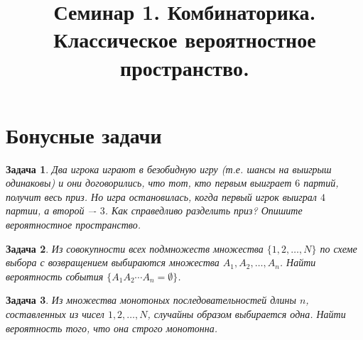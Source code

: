 \documentclass[11pt]{article}
\title{Семинар 1. Комбинаторика. Классическое вероятностное пространство.}
\date{\vspace{-1cm}}
\newtheorem{fproblem}{Задача}
\begin{document}
\maketitle

\section*{Бонусные задачи}
\begin{fproblem}
    Два игрока играют в безобидную игру (т.е. шансы на выигрыш одинаковы) и они договорились, что тот, кто первым выиграет $6$ партий, получит весь приз.
    Но игра остановилась, когда первый игрок выиграл $4$ партии, а второй –- $3$.
    Как справедливо разделить приз?
    Опишите вероятностное пространство.
\end{fproblem}

\begin{fproblem}
    Из совокупности всех подмножеств множества $\{1, 2, \ldots, N \}$ по схеме выбора с возвращением выбираются множества $A_1, A_2, \ldots, A_n$.
    Найти вероятность события $\{A_1 A_2 \cdots A_n = \emptyset\}$.
\end{fproblem}

\begin{fproblem}
    Из множества монотоных последовательностей длины $n$, составленных из чисел $1, 2, \ldots, N$, случайны образом выбирается одна.
    Найти вероятность того, что она строго монотонна.
\end{fproblem}
\end{document}
